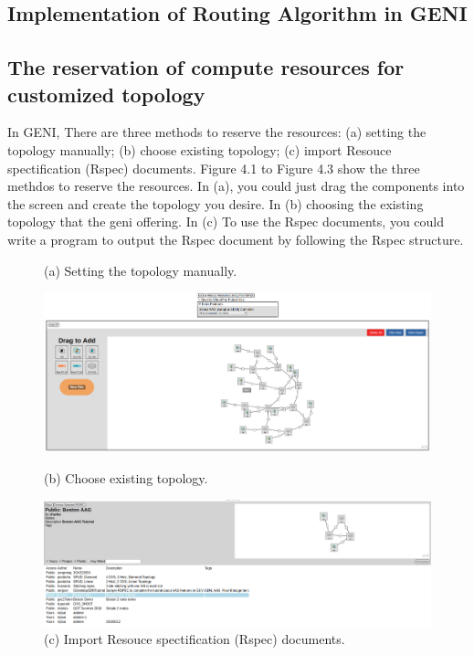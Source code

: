 \documentclass[a4paper,12pt]{report}
\begin{document}
\begin{large}
  \chapter{Implementation of Routing Algorithm in GENI}
	  	\section{The reservation of compute resources for customized topology}
			\qquad In GENI, There are three methods to reserve the resources: (a) setting the topology manually; (b) choose existing topology; (c) import Resouce spectification (Rspec) documents. Figure 4.1 to Figure 4.3 show the three methdos to reserve the resources. In (a), you could just drag the components into the screen and create the topology you desire. In (b) choosing the existing topology that the geni offering. In (c) To use the Rspec documents, you could write a program to output the Rspec document by following the Rspec structure.
			\begin{figure}
	          \caption{(a) Setting the topology manually.}
	          \centering
	            \includegraphics[width=1.0\textwidth]{geni_manual.png}
	          \caption{(b) Choose existing topology.}
	            \includegraphics[width=1.0\textwidth]{choose_existing.png}
	          \caption{(c) Import Resouce spectification (Rspec) documents.}

\end{figure}
\end{large}
\end{document}

